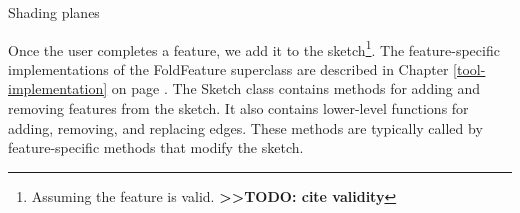 Shading planes

Once the user completes a feature, we add it to the sketch\footnote{Assuming
  the feature is valid. \textbf{\textgreater{}\textgreater{}TODO: cite
  validity}}. The feature-specific implementations of the FoldFeature
superclass are described in Chapter \ref{tool-implementation} on page
\pageref{tool-implementation}. The Sketch class contains methods for
adding and removing features from the sketch. It also contains
lower-level functions for adding, removing, and replacing edges. These
methods are typically called by feature-specific methods that modify the
sketch.
